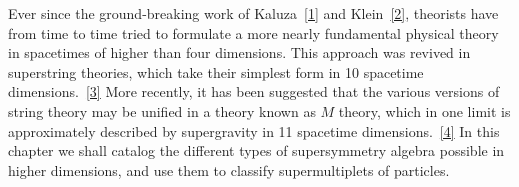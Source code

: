 
Ever since the ground-breaking work of Kaluza~\hyperref[ch32-ref-1]{[1]}
and Klein~\hyperref[ch32-ref-2]{[2]}, theorists have from time to time
tried to formulate a more nearly fundamental physical theory in spacetimes
of higher than four dimensions. This approach was revived in superstring
theories, which take their simplest form in 10 spacetime
dimensions.~\hyperref[ch32-ref-3]{[3]} More recently, it has been suggested
that the various versions of string theory may be unified in a theory known
as \(M\) theory, which in one limit is approximately described by
supergravity in 11 spacetime dimensions.~\hyperref[ch32-ref-4]{[4]} In this
chapter we shall catalog the different types of supersymmetry algebra
possible in higher dimensions, and use them to classify supermultiplets of
particles.
